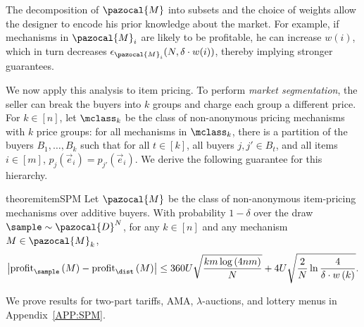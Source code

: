 The decomposition of $\pazocal{M}$ into subsets and the choice of weights allow the designer to encode his prior knowledge about the market. For example, if mechanisms in $\pazocal{M}_i$ are likely to be profitable, he can increase $w(i)$, which in turn decreases $\epsilon_{\pazocal{M}_i}(N, \delta \cdot w(i))$, thereby implying stronger guarantees.

We now apply this analysis to item pricing. To perform \emph{market segmentation}, the seller can break the buyers into $k$ groups and charge each group a different price. For $k \in [n]$, let $\mclass_k$ be the class of non-anonymous pricing mechanisms with $k$ price groups: for all mechanisms in $\mclass_k$, there is a partition of the buyers $B_1, \dots, B_k$ such that for all $t \in [k]$, all buyers $j,j' \in B_t$, and all items $i \in [m]$, $p_j(\vec{e}_i) = p_{j'}(\vec{e}_i)$.  We derive the following guarantee for this hierarchy.
\begin{restatable}{theorem}{itemSPM}\label{thm:item_pricing_SPM}
Let $\pazocal{M}$ be the class of non-anonymous item-pricing mechanisms over additive buyers. With probability $1-\delta$ over the draw $\sample \sim \pazocal{D}^N$, for any $k \in [n]$ and any mechanism $M \in \pazocal{M}_k$, \[\left|\profit_{\sample}\left(M\right) - \profit_{\dist}\left(M\right)\right| \leq 360U \sqrt{\frac{km \log \left(4nm\right)}{N}} + 4U\sqrt{\frac{2}{N}\ln \frac{4}{\delta \cdot w\left(k\right)}}.\]
\end{restatable}

We prove results for two-part tariffs, AMA, $\lambda$-auctions, and lottery menus in Appendix~\ref{APP:SPM}.
